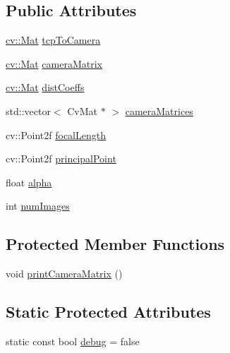 \subsection*{Public Attributes}
\begin{DoxyCompactItemize}
\item 
\hyperlink{namespacecv_a60d81b54f4914bec4cc4a72ab77eb444}{cv\+::\+Mat} \hyperlink{classsvl_c_c_d_l_r_calibration_file_i_o_ac4ceadd11cc10224168d3826060d7ceb}{tcp\+To\+Camera}
\item 
\hyperlink{namespacecv_a60d81b54f4914bec4cc4a72ab77eb444}{cv\+::\+Mat} \hyperlink{classsvl_c_c_d_l_r_calibration_file_i_o_a909b7fc4fc523ca0ce0b886ba3c094a0}{camera\+Matrix}
\item 
\hyperlink{namespacecv_a60d81b54f4914bec4cc4a72ab77eb444}{cv\+::\+Mat} \hyperlink{classsvl_c_c_d_l_r_calibration_file_i_o_a48b6994614586db7b2206f3da58ffe16}{dist\+Coeffs}
\item 
std\+::vector$<$ Cv\+Mat $\ast$ $>$ \hyperlink{classsvl_c_c_d_l_r_calibration_file_i_o_a4142b7141bcc1f152b1f1d21d8a6fc99}{camera\+Matrices}
\item 
cv\+::\+Point2f \hyperlink{classsvl_c_c_d_l_r_calibration_file_i_o_a2d3fdaada2b9dae1be3051a7df91148c}{focal\+Length}
\item 
cv\+::\+Point2f \hyperlink{classsvl_c_c_d_l_r_calibration_file_i_o_abc46a8c4ff95eaeded6947fd20a37b29}{principal\+Point}
\item 
float \hyperlink{classsvl_c_c_d_l_r_calibration_file_i_o_abc7c8f8276f79183ec8275c0dc3e976c}{alpha}
\item 
int \hyperlink{classsvl_c_c_d_l_r_calibration_file_i_o_aea95d20c4c61996153cb1ca3732f7f00}{num\+Images}
\end{DoxyCompactItemize}
\subsection*{Protected Member Functions}
\begin{DoxyCompactItemize}
\item 
void \hyperlink{classsvl_c_c_d_l_r_calibration_file_i_o_a6767deca13358d8a8e7ef5fd3cd43926}{print\+Camera\+Matrix} ()
\end{DoxyCompactItemize}
\subsection*{Static Protected Attributes}
\begin{DoxyCompactItemize}
\item 
static const bool \hyperlink{classsvl_c_c_d_l_r_calibration_file_i_o_a86495c1da7539fd80662b71d1e5ed7a3}{debug} = false
\end{DoxyCompactItemize}
